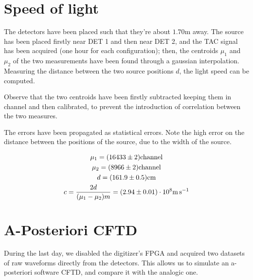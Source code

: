 \documentclass[11pt,a4 paper]{article}
\let\oldfrac\frac
\renewcommand{\frac}[3][d]{\ifthenelse{\equal{#1}{d}}{\oldfrac{#2}{#3}}{\nicefrac{#2}{#3}}}
\begin{document}
\section{Speed of light}
The detectors have been placed such that they're about $1.70\si{\metre}$ away. The  source has been placed firstly near DET 1 and then near DET 2, and the TAC signal has been acquired (one hour for each configuration); then, the centroids $\mu_1$ and $\mu_2$ of the two measurements have been found through a gaussian interpolation. Measuring the distance between the two source positions $d$, the light speed can be computed.

Observe that the two centroids have been firstly subtracted keeping them in channel and then calibrated, to prevent the introduction of correlation between the two measures.

The errors have been propagated as statistical errors. Note the high error on the distance between the positions of the source, due to the width of the source.

\begin{gather*}
    \mu_1 = (16433 \pm 2)\si{channel}\\
    \mu_2 = (8966 \pm 2)\si{channel} \\
    d = (161.9 \pm 0.5) \si{\centi\metre} \\
    c = \frac{2d}{(\mu_1-\mu_2)m} = (2.94 \pm 0.01 )\cdot 10^8 \si{\metre\per\second}
\end{gather*}

\section{A-Posteriori CFTD}
During the last day, we disabled the digitizer's FPGA and acquired two datasets of raw waveforms directly from the detectors. This allows us to simulate an a-posteriori software CFTD, and compare it with the analogic one.
\end{document}

